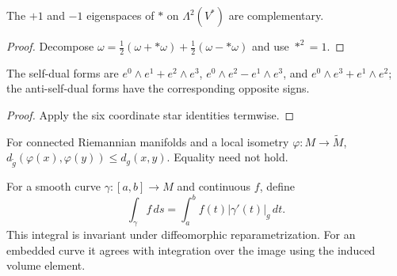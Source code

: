 \begin{proposition}
\label{prop:self-dual-decomposition}





The $+1$ and $-1$ eigenspaces of $*$ on $\Lambda^2(V^*)$ are complementary.
\end{proposition}
\begin{proof}

\sketch Decompose $\omega=\frac12(\omega+*\omega)+\frac12(\omega-*\omega)$ and use $*^2=1$.
\end{proof}

\begin{proposition}
\label{prop:self-dual-euclidean}




The self-dual forms are $e^0\wedge e^1+e^2\wedge e^3$, $e^0\wedge e^2-e^1\wedge e^3$, and $e^0\wedge e^3+e^1\wedge e^2$; the anti-self-dual forms have the corresponding opposite signs.
\end{proposition}
\begin{proof}

\sketch Apply the six coordinate star identities termwise.
\end{proof}

\begin{proposition}\label{prop:local-isometry-distance}


For connected Riemannian manifolds and a local isometry
$\varphi:M\to\widetilde M$,
$d_{\widetilde g}(\varphi(x),\varphi(y))\le d_g(x,y)$. Equality need not hold.
\end{proposition}

\begin{proposition}\label{prop:arc-length-integral}
For a smooth curve $\gamma:[a,b]\to M$ and continuous $f$, define
\[
\int_\gamma f\,ds=\int_a^bf(t)|\gamma'(t)|_g\,dt.
\]
This integral is invariant under diffeomorphic reparametrization. For an
embedded curve it agrees with integration over the image using the induced
volume element.
\end{proposition}

